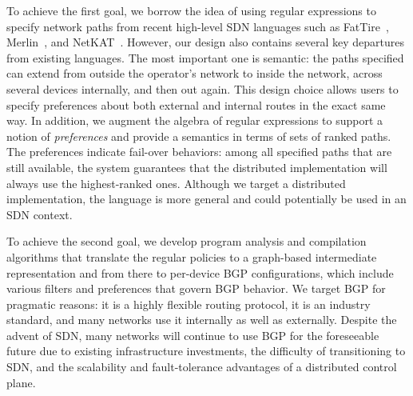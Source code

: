 \documentclass[10pt]{sigalternate052015}
\begin{document}
To achieve the first goal, we borrow the idea of using regular
expressions to specify network paths from
recent high-level SDN languages such as FatTire~\cite{fattire},
Merlin~\cite{foster:merlin}, and
NetKAT~\cite{netkat}.  However, our design also contains several key
departures from existing languages.  The most important one is semantic:  the paths specified
can extend from outside the operator's network to inside
the network, across several devices internally, and then out again. This design
choice allows users to specify preferences about both external and internal
routes in the exact same way.
In addition, we augment the algebra
of regular expressions to support a notion of {\em preferences} and provide a semantics in terms of sets of ranked paths. The preferences indicate fail-over behaviors:  among all specified paths that are still available,
the system guarantees that the distributed implementation will always use the highest-ranked ones.
Although we target a distributed implementation, the language is more general and could potentially be used in an SDN context.


To achieve the second goal, we develop program analysis and compilation
algorithms that translate the regular policies to a graph-based
intermediate representation and from there to per-device BGP configurations, which include various filters and preferences that govern BGP behavior.
We target BGP for pragmatic reasons:
it is a highly flexible routing protocol,
it is an industry standard,
and many networks use it internally as well as externally.
Despite the advent of SDN, many networks will continue to
use BGP for the foreseeable future due to existing infrastructure investments, the difficulty of transitioning to SDN, and the scalability and fault-tolerance advantages of a distributed
control plane.
\end{document}
